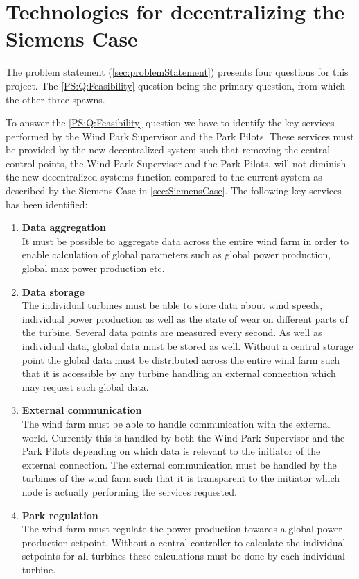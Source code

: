 \chapter{Technologies for decentralizing the Siemens Case}

The problem statement (\cref{sec:problemStatement}) presents four questions for this project. The \ref{PS:Q:Feasibility} question being the primary question, from which the other three spawns. 

To answer the \ref{PS:Q:Feasibility} question we have to identify the key services performed by the Wind Park Supervisor and the Park Pilots. These services must be provided by the new decentralized system such that removing the central control points, the Wind Park Supervisor and the Park Pilots, will not diminish the new decentralized systems function compared to the current system as described by the Siemens Case in \cref{sec:SiemensCase}. The following key services has been identified:

\begin{enumerate}[label=\textbf{\alph*.}, ref=\textit{\alph*}]
\item \label{Analysis:need:a} \textbf{Data aggregation} \\
	It must be possible to aggregate data across the entire wind farm in order to enable calculation of global parameters such as global power production, global max power production etc. 

\item \label{Analysis:need:b} \textbf{Data storage} \\
	The individual turbines must be able to store data about wind speeds, individual power production as well as the state of wear on different parts of the turbine. Several data points are measured every second. As well as individual data, global data must be stored as well. Without a central storage point the global data must be distributed across the entire wind farm such that it is accessible by any turbine handling an external connection which may request such global data.

\item \label{Analysis:need:c} \textbf{External communication} \\
	The wind farm must be able to handle communication with the external world. Currently this is handled by both the Wind Park Supervisor and the Park Pilots depending on which data is relevant to the initiator of the external connection. The external communication must be handled by the turbines of the wind farm such that it is transparent to the initiator which node is actually performing the services requested.

\item \label{Analysis:need:d} \textbf{Park regulation} \\
	The wind farm must regulate the power production towards a global power production setpoint. Without a central controller to calculate the individual setpoints for all turbines these calculations must be done by each individual turbine.
	
\end{enumerate}

